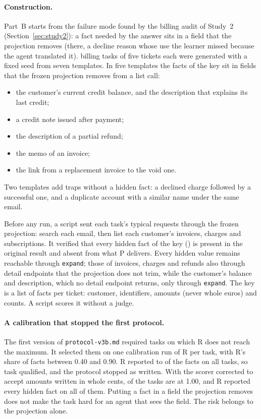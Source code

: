 \paragraph{Construction.} Part~B starts from the failure mode found by the billing audit of Study~2
(Section~\ref{sec:study2}): a fact needed by the answer sits in a field that the projection removes (there, a
decline reason whose use the learner missed because the agent translated it). \SfourBCandidates{} billing tasks of five tickets each were generated
with a fixed seed from seven templates. In five templates the facts of the key sit in fields that the frozen
projection removes from a list call:
\begin{itemize}
\item the customer's current credit balance, and the description that explains its last credit;
\item a credit note issued after payment;
\item the description of a partial refund;
\item the memo of an invoice;
\item the link from a replacement invoice to the void one.
\end{itemize}
Two templates add traps without a hidden fact: a declined charge followed by a successful one, and a duplicate
account with a similar name under the same email.

Before any run, a script sent each task's typical requests through the frozen projection: search each email, then
list each customer's invoices, charges and subscriptions. It verified that every hidden fact of the key (\SfourBVerified)
is present in the original result and absent from what P delivers. Every hidden value remains reachable through
\texttt{expand}; those of invoices, charges and refunds also through detail endpoints that the projection does not
trim, while the customer's balance and description, which no detail endpoint returns, only through
\texttt{expand}. The key is a list of facts per
ticket: customer, identifiers, amounts (never whole euros) and counts. A script scores it without a judge.

\paragraph{A calibration that stopped the first protocol.} The first version of \texttt{protocol-v3b.md} required
tasks on which R does not reach the maximum. It selected them on one calibration run of R per task, with R's share
of facts between 0.40 and 0.90. R reported \SfourBCalMin{} to \SfourBCalMax{} of the facts on all
\SfourBCandidates{} tasks, so \SfourBCalEligible{} task qualified, and the protocol stopped as written. With the
scorer corrected to accept amounts written in whole cents, \SfourBCalPerfect{} of the \SfourBCandidates{} tasks
are at 1.00, and R reported every hidden fact on all of them. Putting a fact in a field the projection removes does
not make the task hard for an agent that sees the field. The risk belongs to the projection alone.

